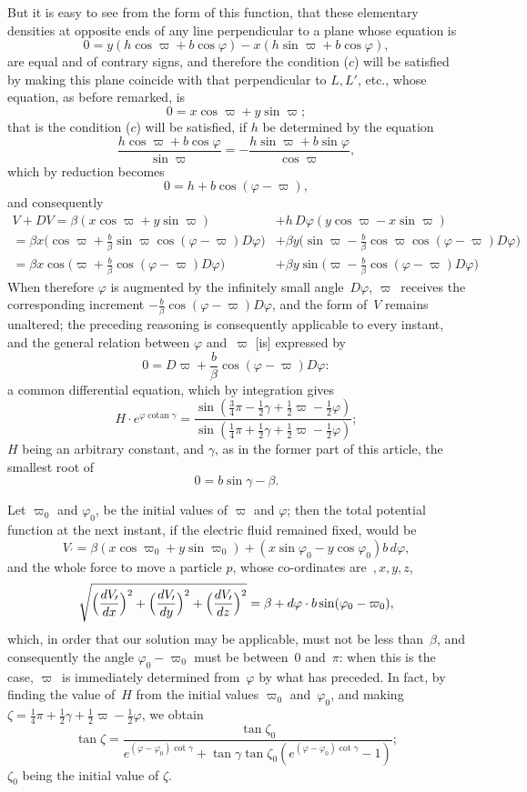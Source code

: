 \documentclass[12pt,notitlepage]{amsart}
\DeclareMathOperator{\cotan}{\textrm{cotan}}
\renewcommand{\phi}{\varphi}
\begin{document}
But it is easy to see from the form of this function, that these elementary
densities at opposite ends of any line
perpendicular to a plane whose equation is
\[
0 = y(h\cos\varpi+b\cos\phi)-x(h\sin\varpi+b\cos\phi),
\]
are equal and of contrary signs, and therefore the condition ($c$) will be 
satisfied by making this plane coincide with that perpendicular
to $L,L'$, etc.,
whose equation, as before remarked, is
\[
0=x\cos\varpi+y\sin\varpi;
\]
that is the condition ($c$) will be satisfied,
if $h$ be determined by the equation
\[
\frac{h\cos\varpi+b\cos\phi}{\sin\varpi}
=-\frac{h\sin\varpi+b\sin\phi}{\cos\varpi},
\]
which by reduction becomes
\[
0=h+b\cos(\phi-\varpi),
\]
and consequently
\[
\begin{aligned}
V+DV=\beta(x\cos\varpi+y\sin\varpi) &+ h\,D\phi(y\cos\varpi-x\sin\varpi)\\
=\beta x\bigl(\cos\varpi+\frac b\beta\sin\varpi\cos(\phi-\varpi)D\phi\bigr)
&+\beta y\bigl(\sin\varpi-\frac b\beta\cos\varpi\cos(\phi-\varpi)D\phi\bigr)\\
=\beta x\cos\bigl(\varpi+\frac b\beta\cos(\phi-\varpi)D\phi\bigr)
&+\beta y\sin\bigl(\varpi-\frac b\beta\cos(\phi-\varpi)D\phi\bigr)
\end{aligned}
\]
When therefore $\phi$ is augmented
by the infinitely small angle~$D\phi$, $\varpi$~receives
the corresponding increment $-\frac b\beta\cos(\phi-\varpi)D\phi$,
and the form of~$V$ remains
unaltered; the preceding reasoning is consequently applicable to every instant,
and the general relation between $\phi$ and~$\varpi$ [is] expressed by
\[
0=D\varpi+\frac b\beta\cos(\phi-\varpi)D\phi:
\]
a common differential equation, which by integration gives
\[
H\cdot e^{\phi\cotan\gamma}=
\frac{\sin(\frac34\pi-\frac12\gamma+\frac12\varpi-\frac12\phi)}
{\sin(\frac14\pi+\frac12\gamma+\frac12\varpi-\frac12\phi)};
\]
$H$ being an arbitrary constant, and $\gamma$,
as in the former part of this article,
the smallest root of
\[
0=b\sin\gamma-\beta.
\]

Let $\varpi_0$ and $\phi_0$, be the initial values of $\varpi$ and $\phi$;
then the total potential function at the next instant,
if the electric fluid remained fixed, would be
\[
V_\prime=
\beta(x\cos\varpi_0+y\sin\varpi_0)+(x\sin\phi_0-y\cos\phi_0)b\,d\phi,
\]
and the whole force to move a particle $p$, whose co-ordinates are~$,x,y,z$,
\[
\sqrt{
  \Bigl(\frac{dV_\prime}{dx}\Bigr)^2
  +\Bigl(\frac{dV_\prime}{dy}\Bigr)^2
  +\Bigl(\frac{dV_\prime}{dz}\Bigr)^2
}=\beta+d\phi\cdot b\sin(\phi_0-\varpi_0),
\]
which, in order that our solution may be applicable, must not be less 
than~$\beta$,
and consequently the angle $\phi_0-\varpi_0$
must be between~$0$ and~$\pi$: when this is
the case, $\varpi$~is immediately determined from~$\phi$
by what has preceded. In
fact, by finding the value of~$H$ from the initial
values $\varpi_0$ and~$\phi_0$, and
making $\zeta=\frac14\pi+\frac12\gamma+\frac12\varpi-\frac12\phi$, we obtain
\[
\tan\zeta=
\frac{\tan\zeta_0}
{e^{(\phi-\phi_0)\cot\gamma}+\tan\gamma\tan\zeta_0
(e^{(\phi-\phi_0)\cot\gamma}-1)};
\]
$\zeta_0$ being the initial value of $\zeta$.
\end{document}
